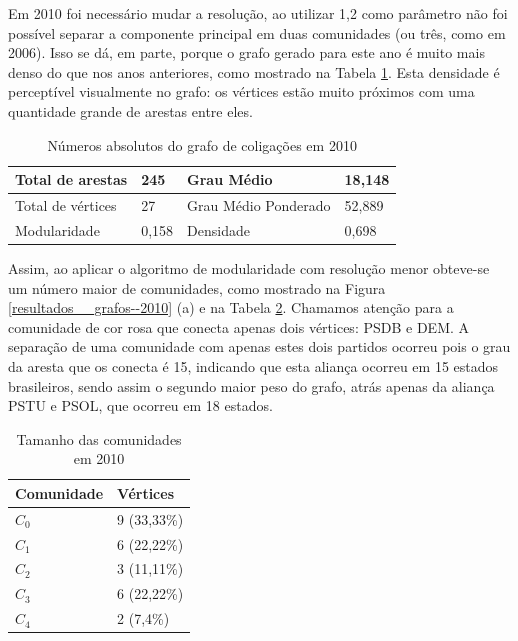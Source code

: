 Em 2010 foi necessário mudar a resolução, ao utilizar 1,2 como parâmetro não foi possível separar a componente principal em duas comunidades (ou três, como em 2006). Isso se dá, em parte, porque o grafo gerado para este ano é muito mais denso do que nos anos anteriores, como mostrado na Tabela \ref{table-2010a}. Esta densidade é perceptível visualmente no grafo: os vértices estão muito próximos com uma quantidade grande de arestas entre eles. 

\begin{table}[H]
\centering
\begin{tabular}{|l|l|l|l|}
\hline
Total de arestas  & 245 & Grau Médio           & 18,148 \\ \hline
Total de vértices & 27 & Grau Médio Ponderado & 52,889 \\ \hline
Modularidade      & 0,158 & Densidade            & 0,698 \\ \hline
\end{tabular}
\caption{Números absolutos do grafo de coligações em 2010}
\label{table-2010a}
\end{table}

Assim, ao aplicar o algoritmo de modularidade com resolução menor obteve-se um número maior de comunidades, como mostrado na Figura \ref{resultados__grafos--2010} (a) e na Tabela \ref{table-2010b}. Chamamos atenção para a comunidade de cor rosa que conecta apenas dois vértices: \gls{PSDB} e \gls{DEM}. A separação de uma comunidade com apenas estes dois partidos ocorreu pois o grau da aresta que os conecta é 15, indicando que esta aliança ocorreu em 15 estados brasileiros, sendo assim o segundo maior peso do grafo, atrás apenas da aliança \gls{PSTU} e \gls{PSOL}, que ocorreu em 18 estados.

\begin{table}[H]
\centering
\begin{tabular}{|l|l|}
\hline
Comunidade & Vértices \\ \hline
$C_0$         &     9 (33,33\%)                \\ \hline
$C_1$         &     6 (22,22\%)                \\ \hline
$C_2$         &       3 (11,11\%)               \\ \hline
$C_3$         &       6 (22,22\%)               \\ \hline
$C_4$         &       2 (7,4\%)               \\ \hline
\end{tabular}
\caption{Tamanho das comunidades em 2010}
\label{table-2010b}
\end{table}


